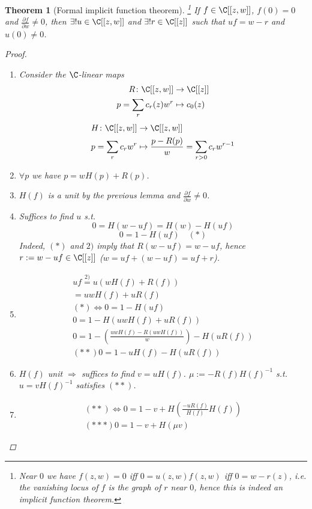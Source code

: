 \documentclass[A4paper, british]{amsart}
\theoremstyle{darkgreentheorem}
\newtheorem{thm}{Theorem}[section]
\theoremstyle{darkbluedefinition}
\theoremstyle{darkredexample}
\theoremstyle{remark}
\newcommand{\1}{\mathbbm{1}}
\begin{document}
\begin{thm}[Formal implicit function theorem]\footnote{Near $0$ we have $f(z,w)=0$ iff $0=u(z,w)f(z,w)$ iff $0=w-r(z)$, i.e. the vanishing locus of $f$ is the graph of $r$ near $0$, hence this is indeed an implicit function theorem.}
    If $f\in \C[[z,w]]$, $f(0)=0$ and $\frac{\partial f}{\partial w}\neq 0$, then $\exists ! u\in \C[[z,w]]$ and $\exists ! r\in \C[[z]]$ such that $uf=w-r$ and $u(0)\neq 0$.
    \begin{proof}
	\begin{enumerate}[label=\arabic*)]
	    \item Consider the $\C$-linear maps
		\begin{align*}
		    R\colon \C[[z,w]] & \to \C[[z]] \\
		    p=\sum_{r}c_{r}(z)w^{r} & \mapsto c_{0}(z)
		\end{align*}
		\begin{align*}
		    H\colon \C[[z,w]] &\to \C[[z,w]] \\
		    p=\sum_{r}c_{r}w^{r} & \mapsto \frac{p-R(p)}{w}=\sum_{r>0}c_{r}w^{r-1}
		\end{align*}
	    \item $\forall p$ we have $p=wH(p)+R(p)$.
	    \item $H(f)$ is a unit by the previous lemma and $\frac{\partial f}{\partial w}\neq 0$.
	    \item Suffices to find $u$ s.t.
		\[ 0=H(w-uf)=H(w)-H(uf)\]
		\[ 0=1-H(uf) \quad (*) \]
		Indeed, $(*)$ and $2)$ imply that $R(w-uf)=w-uf$, hence $r:=w-uf\in \C[[z]]$ ($w=uf+(w-uf)=uf+r$).
	    \item \begin{multline*}
		    uf\overset{2)}{=} u(wH(f)+R(f))\\
		    =uwH(f)+uR(f)\\
		    (*)\Leftrightarrow 0=1-H(uf)\\
		    0=1-H(uwH(f)+uR(f)) \\
		    0=1-(\frac{uwH(f)-R(uwH(f))}{w})-H(uR(f)) \\
		    (**) 0=1-uH(f)-H(uR(f))
	    \end{multline*}
	\item $H(f)$ unit $\Rightarrow $ suffices to find $v=uH(f)$.
	    $\mu:=-R(f)H(f)^{-1}$ s.t. $u=vH(f)^{-1}$ satisfies $(**)$.
	\item \begin{multline*}
		(**)\Leftrightarrow 0=1-v+H(\frac{-uR(f)}{H(f)}H(f)) \\
		(***) 0=1-v+H(\mu v)

\end{multline*}
\end{enumerate}
\end{proof}
\end{thm}
\end{document}
